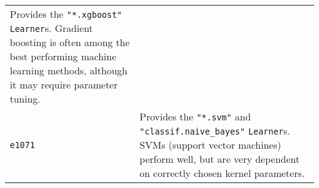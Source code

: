 \documentclass[]{article}
\begin{document}
\begin{longtable}[]{@{}ll@{}}
\begin{minipage}[t]{0.81\columnwidth}
Provides the \texttt{"*.xgboost"} \texttt{Learner}s. Gradient boosting
is often among the best performing machine learning methods, although it
may require parameter tuning.\strut
\end{minipage}\tabularnewline
\begin{minipage}[t]{0.13\columnwidth}\raggedright
\texttt{e1071}\strut
\end{minipage} & \begin{minipage}[t]{0.81\columnwidth}\raggedright
Provides the \texttt{"*.svm"} and \texttt{"classif.naive\_bayes"}
\texttt{Learner}s. SVMs (support vector machines) perform well, but are
very dependent on correctly chosen kernel parameters.\strut
\end{minipage}\tabularnewline
\bottomrule
\end{longtable}
\end{document}
